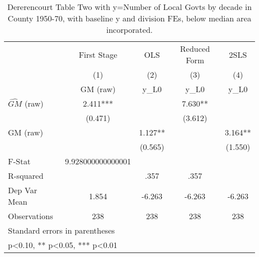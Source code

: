\begin{table}[htbp]\centering
\def\sym#1{\ifmmode^{#1}\else\(^{#1}\)\fi}
\caption{Dererencourt Table Two with y=Number of Local Govts by decade in County 1950-70, with baseline y and division FEs, below median area incorporated.}
\begin{tabular}{l*{4}{c}}
\toprule
                    & First Stage   &         OLS   &Reduced Form   &        2SLS   \\
                    &\multicolumn{1}{c}{(1)}&\multicolumn{1}{c}{(2)}&\multicolumn{1}{c}{(3)}&\multicolumn{1}{c}{(4)}\\
                    &\multicolumn{1}{c}{GM  (raw)}&\multicolumn{1}{c}{y\_L0}&\multicolumn{1}{c}{y\_L0}&\multicolumn{1}{c}{y\_L0}\\
\midrule
$\hat{GM}$ (raw)    &       2.411***&               &       7.630** &               \\
                    &     (0.471)   &               &     (3.612)   &               \\
\addlinespace
GM  (raw)           &               &       1.127** &               &       3.164** \\
                    &               &     (0.565)   &               &     (1.550)   \\
\midrule
F-Stat              &9.928000000000001   &               &               &               \\
R-squared           &               &        .357   &        .357   &               \\
Dep Var Mean        &       1.854   &      -6.263   &      -6.263   &      -6.263   \\
Observations        &         238   &         238   &         238   &         238   \\
\bottomrule
\multicolumn{5}{l}{\footnotesize Standard errors in parentheses}\\
\multicolumn{5}{l}{\footnotesize * p<0.10, ** p<0.05, *** p<0.01}\\
\end{tabular}
\end{table}
